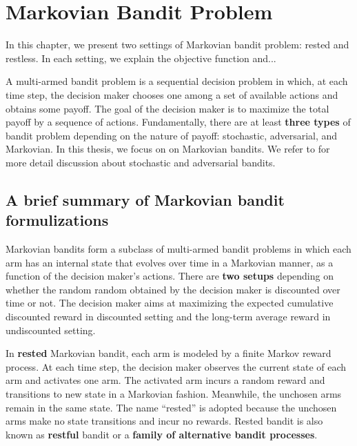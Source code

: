 \begingroup
\let\clearpage\relax

\chapter{Markovian Bandit Problem}
\label{ch:mb}

In this chapter, we present two settings of Markovian bandit problem: rested and restless.
In each setting, we explain the objective function and...

A multi-armed bandit problem is a sequential decision problem in which, at each time step, the decision maker chooses one among a set of available actions and obtains some payoff.
The goal of the decision maker is to maximize the total payoff by a sequence of actions.
Fundamentally, there are at least \textbf{three types} of bandit problem depending on the nature of payoff: stochastic, adversarial, and Markovian.
In this thesis, we focus on on Markovian bandits.
We refer to \cite{bubeck2012regret} for more detail discussion about stochastic and adversarial bandits.

\section{A brief summary of Markovian bandit formulizations}

Markovian bandits form a subclass of multi-armed bandit problems in which each arm has an internal state that evolves over time in a Markovian manner, as a function of the decision maker’s actions.
There are \textbf{two setups} depending on whether the random random obtained by the decision maker is discounted over time or not.
The decision maker aims at maximizing the expected cumulative discounted reward in discounted setting and the long-term average reward in undiscounted setting.

In \textbf{rested} Markovian bandit, each arm is modeled by a finite Markov reward process. At each time step, the decision maker observes the current state of each arm and activates one arm.
The activated arm incurs a random reward and transitions to new state in a Markovian fashion.
Meanwhile, the unchosen arms remain in the same state.
The name ``rested'' is adopted because the unchosen arms make no state transitions and incur no rewards.
Rested bandit is also known as \textbf{restful} bandit or a \textbf{family of alternative bandit processes}.

